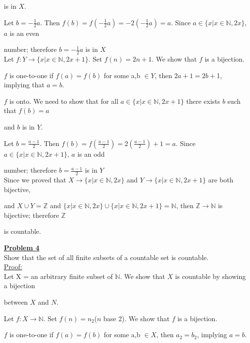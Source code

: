 \documentclass[11pt]{article}
\begin{document}
	is in $X$. 

	Let $b=-\frac{1}{2}a$. Then $f(b) = f(-\frac{1}{2}a) = -2(-\frac{1}{2}a) = a$. Since $a\in \{x|x \in \mathbb{N}, 2x \}$, $a$ is an even

 	number; therefore  $b=-\frac{1}{2}a$ is in $X$\\

	Let $f:Y \rightarrow \{x|x \in \mathbb{N}, 2x+1 \}$. Set $f(n)=2n+1$. We show that $f$ is a bijection.

	$f$ is one-to-one if $f(a) = f(b)$ for some a,b $\in Y$, then $2a+1 = 2b+$1, implying that $a=b$.

	$f$ is onto. We need to show that for all $a \in \{x|x \in \mathbb{N}, 2x+1 \}$ there exists $b$ such that $f(b)=a$ 

	and $b$ is in $Y$. 

	Let $b=\frac{a-1}{2}$. Then $f(b) = f(\frac{a-1}{2}) = 2(\frac{a-1}{2})+1 = a$. Since $a\in \{x|x \in \mathbb{N}, 2x+1 \}$, $a$ is an odd 

	number; therefore  $b=\frac{a-1}{2}$ is in $Y$ \\

	Since we proved that $X \rightarrow \{x|x \in \mathbb{N}, 2x \}$ and $Y \rightarrow \{x|x \in \mathbb{N}, 2x+1 \}$ are both bijective,

	and $X \cup Y = \mathbb{Z}$ and $\{x|x \in \mathbb{N}, 2x \} \cup \{x|x \in \mathbb{N}, 2x+1 \} = \mathbb{N}$, then $\mathbb{Z} \rightarrow \mathbb{N}$ is bijective; therefore $\mathbb{Z}$ 

is countable.

\newpage
\noindent\textbf{\underline{Problem 4}}\\
	Show that the set of all finite subsets of a countable set is countable.\\

	\underline{Proof:} \\

	Let X = an arbitrary finite subset of $\mathbb{N}$. We show that $X$ is countable by showing a bijection 

	between $X$ and $N$.

	Let $f: X \rightarrow \mathbb{N}$. Set $f(n)=n_2$($n$ base 2). We show that $f$ is a bijection.

	$f$ is one-to-one if $f(a) = f(b)$ for some a,b $\in X$, then $a_2 = b_2$, implying $a = b$.
\end{document}
